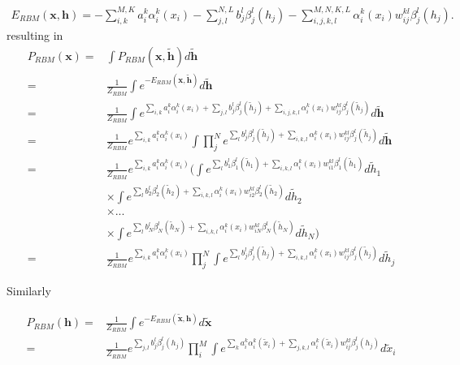 \documentclass[%
oneside,                 %
final,                   %
10pt]{article}
\begin{document}
\begin{align}
	E_{RBM}(\bm{x}, \bm{h}) = - \sum_{i, k}^{M, K} a_i^k \alpha_i^k (x_i)
	- \sum_{j, l}^{N, L} b_j^l \beta_j^l (h_j) 
	- \sum_{i,j,k,l}^{M,N,K,L} \alpha_i^k (x_i) w_{ij}^{kl} \beta_j^l (h_j). 
\end{align}
resulting in 
\begin{align}
	P_{RBM} (\bm{x}) =& \int P_{RBM} (\bm{x}, \tilde{\bm{h}})  d \tilde{\bm{h}} \nonumber \\
	=& \frac{1}{Z_{RBM}} \int e^{-E_{RBM} (\bm{x}, \tilde{\bm{h}}) } d\tilde{\bm{h}} \nonumber \\
	=& \frac{1}{Z_{RBM}} \int e^{\sum_{i, k} a_i^k \alpha_i^k (x_i)
	+ \sum_{j, l} b_j^l \beta_j^l (\tilde{h}_j) 
	+ \sum_{i,j,k,l} \alpha_i^k (x_i) w_{ij}^{kl} \beta_j^l (\tilde{h}_j)} 
	d\tilde{\bm{h}} \nonumber \\
	=& \frac{1}{Z_{RBM}} e^{\sum_{i, k} a_i^k \alpha_i^k (x_i)}
	\int \prod_j^N e^{\sum_l b_j^l \beta_j^l (\tilde{h}_j) 
	+ \sum_{i,k,l} \alpha_i^k (x_i) w_{ij}^{kl} \beta_j^l (\tilde{h}_j)} d\tilde{\bm{h}} \nonumber \\
	=& \frac{1}{Z_{RBM}} e^{\sum_{i, k} a_i^k \alpha_i^k (x_i)}
	\biggl( \int e^{\sum_l b_1^l \beta_1^l (\tilde{h}_1) + \sum_{i,k,l} \alpha_i^k (x_i) w_{i1}^{kl} \beta_1^l (\tilde{h}_1)} d \tilde{h}_1 \nonumber \\
	& \times \int e^{\sum_l b_2^l \beta_2^l (\tilde{h}_2) + \sum_{i,k,l} \alpha_i^k (x_i) w_{i2}^{kl} \beta_2^l (\tilde{h}_2)} d \tilde{h}_2 \nonumber \\
	& \times ... \nonumber \\
	& \times \int e^{\sum_l b_N^l \beta_N^l (\tilde{h}_N) + \sum_{i,k,l} \alpha_i^k (x_i) w_{iN}^{kl} \beta_N^l (\tilde{h}_N)} d \tilde{h}_N \biggr) \nonumber \\
	=& \frac{1}{Z_{RBM}} e^{\sum_{i, k} a_i^k \alpha_i^k (x_i)}
	\prod_j^N \int e^{\sum_l b_j^l \beta_j^l (\tilde{h}_j) + \sum_{i,k,l} \alpha_i^k (x_i) w_{ij}^{kl} \beta_j^l (\tilde{h}_j)}  d\tilde{h}_j
\end{align}

Similarly

\begin{align}
	P_{RBM} (\bm{h}) =& \frac{1}{Z_{RBM}} \int e^{-E_{RBM} (\tilde{\bm{x}}, \bm{h})} d\tilde{\bm{x}} \nonumber \\
	=& \frac{1}{Z_{RBM}} e^{\sum_{j, l} b_j^l \beta_j^l (h_j)}
	\prod_i^M \int e^{\sum_k a_i^k \alpha_i^k (\tilde{x}_i)
	+ \sum_{j,k,l} \alpha_i^k (\tilde{x}_i) w_{ij}^{kl} \beta_j^l (h_j)} d\tilde{x}_i
\end{align}
\end{document}
